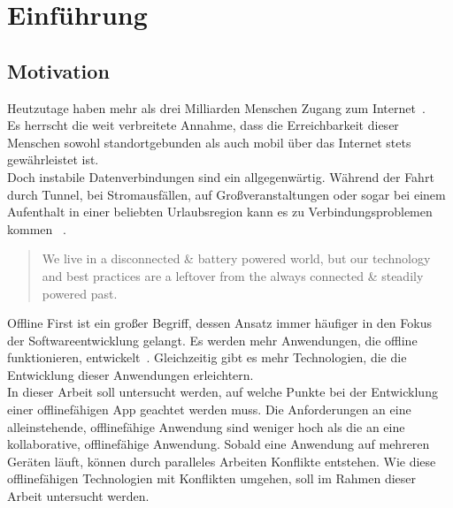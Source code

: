 \chapter{\label{chap:einleitung}Einführung}
\section{Motivation}

Heutzutage haben mehr als drei Milliarden Menschen Zugang zum Internet~\cite{dev-report}.\\
Es herrscht die weit verbreitete Annahme, dass die Erreichbarkeit dieser Menschen sowohl standortgebunden als auch mobil über das Internet stets gewährleistet ist.\\
Doch instabile Datenverbindungen sind ein allgegenwärtig. Während der Fahrt durch Tunnel, bei Stromausfällen, auf Großveranstaltungen oder sogar bei einem Aufenthalt in einer beliebten Urlaubsregion kann es zu Verbindungsproblemen kommen ~\cite{offline_ux, ndr}.
\begin{quote}
	We live in a disconnected \& battery powered world, but our technology and best practices are a leftover from the always connected \& steadily powered past.
	\cite{offlinefirst}
\end{quote}
Offline First ist ein großer Begriff, dessen Ansatz immer häufiger in den Fokus der Softwareentwicklung gelangt. Es werden mehr Anwendungen, die offline funktionieren, entwickelt~\cite{heise}.
Gleichzeitig gibt es mehr Technologien, die die Entwicklung dieser Anwendungen erleichtern.\\
In dieser Arbeit soll untersucht werden, auf welche Punkte bei der Entwicklung einer offlinefähigen \gls{App} geachtet werden muss.
Die Anforderungen an eine alleinstehende, offlinefähige Anwendung sind weniger hoch als die an eine kollaborative, offlinefähige Anwendung.
Sobald eine Anwendung auf mehreren Geräten läuft, können durch paralleles Arbeiten Konflikte entstehen.
Wie diese offlinefähigen Technologien mit Konflikten umgehen, soll im Rahmen dieser Arbeit untersucht werden.
%
%
\clearpage
